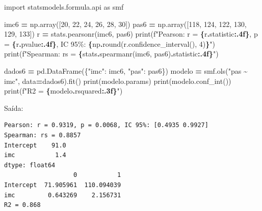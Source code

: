 \documentclass[
]{book}
\newenvironment{Shaded}{\begin{snugshade}}{\end{snugshade}}
\newcommand{\BuiltInTok}[1]{#1}
\newcommand{\DecValTok}[1]{\textcolor[rgb]{0.00,0.00,0.81}{#1}}
\newcommand{\ImportTok}[1]{#1}
\newcommand{\NormalTok}[1]{#1}
\newcommand{\OperatorTok}[1]{\textcolor[rgb]{0.81,0.36,0.00}{\textbf{#1}}}
\newcommand{\SpecialCharTok}[1]{\textcolor[rgb]{0.81,0.36,0.00}{\textbf{#1}}}
\newcommand{\SpecialStringTok}[1]{\textcolor[rgb]{0.31,0.60,0.02}{#1}}
\newcommand{\StringTok}[1]{\textcolor[rgb]{0.31,0.60,0.02}{#1}}
\begin{document}
\begin{Shaded}
\begin{Highlighting}[]
\ImportTok{import}\NormalTok{ statsmodels.formula.api }\ImportTok{as}\NormalTok{ smf}

\NormalTok{imc6 }\OperatorTok{=}\NormalTok{ np.array([}\DecValTok{20}\NormalTok{, }\DecValTok{22}\NormalTok{, }\DecValTok{24}\NormalTok{, }\DecValTok{26}\NormalTok{, }\DecValTok{28}\NormalTok{, }\DecValTok{30}\NormalTok{])}
\NormalTok{pas6 }\OperatorTok{=}\NormalTok{ np.array([}\DecValTok{118}\NormalTok{, }\DecValTok{124}\NormalTok{, }\DecValTok{122}\NormalTok{, }\DecValTok{130}\NormalTok{, }\DecValTok{129}\NormalTok{, }\DecValTok{133}\NormalTok{])}
\NormalTok{r }\OperatorTok{=}\NormalTok{ stats.pearsonr(imc6, pas6)}
\BuiltInTok{print}\NormalTok{(}\SpecialStringTok{f"Pearson: r = }\SpecialCharTok{\{}\NormalTok{r}\SpecialCharTok{.}\NormalTok{statistic}\SpecialCharTok{:.4f\}}\SpecialStringTok{, p = }\SpecialCharTok{\{}\NormalTok{r}\SpecialCharTok{.}\NormalTok{pvalue}\SpecialCharTok{:.4f\}}\SpecialStringTok{, IC 95\%: }\SpecialCharTok{\{}\NormalTok{np}\SpecialCharTok{.}\BuiltInTok{round}\NormalTok{(r.confidence\_interval(), }\DecValTok{4}\NormalTok{)}\SpecialCharTok{\}}\SpecialStringTok{"}\NormalTok{)}
\BuiltInTok{print}\NormalTok{(}\SpecialStringTok{f"Spearman: rs = }\SpecialCharTok{\{}\NormalTok{stats}\SpecialCharTok{.}\NormalTok{spearmanr(imc6, pas6)}\SpecialCharTok{.}\NormalTok{statistic}\SpecialCharTok{:.4f\}}\SpecialStringTok{"}\NormalTok{)}

\NormalTok{dados6 }\OperatorTok{=}\NormalTok{ pd.DataFrame(\{}\StringTok{"imc"}\NormalTok{: imc6, }\StringTok{"pas"}\NormalTok{: pas6\})}
\NormalTok{modelo }\OperatorTok{=}\NormalTok{ smf.ols(}\StringTok{"pas \textasciitilde{} imc"}\NormalTok{, data}\OperatorTok{=}\NormalTok{dados6).fit()}
\BuiltInTok{print}\NormalTok{(modelo.params)}
\BuiltInTok{print}\NormalTok{(modelo.conf\_int())}
\BuiltInTok{print}\NormalTok{(}\SpecialStringTok{f"R2 = }\SpecialCharTok{\{}\NormalTok{modelo}\SpecialCharTok{.}\NormalTok{rsquared}\SpecialCharTok{:.3f\}}\SpecialStringTok{"}\NormalTok{)}
\end{Highlighting}
\end{Shaded}

Saída:

\begin{verbatim}
Pearson: r = 0.9319, p = 0.0068, IC 95%: [0.4935 0.9927]
Spearman: rs = 0.8857
Intercept    91.0
imc           1.4
dtype: float64
                   0           1
Intercept  71.905961  110.094039
imc         0.643269    2.156731
R2 = 0.868
\end{verbatim}
\end{document}

